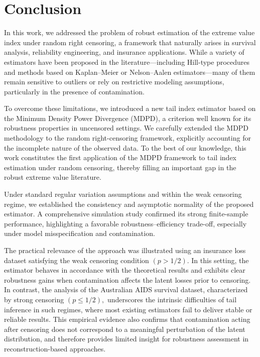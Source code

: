 \documentclass[reqno,openbib,runningheads,a4paper,12pt]{amsart}%
\begin{document}
\section{\textbf{Conclusion}}

\noindent In this work, we addressed the problem of robust estimation of the
extreme value index under random right censoring, a framework that naturally
arises in survival analysis, reliability engineering, and insurance
applications. While a variety of estimators have been proposed in the
literature---including Hill-type procedures and methods based on Kaplan--Meier
or Nelson--Aalen estimators---many of them remain sensitive to outliers or
rely on restrictive modeling assumptions, particularly in the presence of
contamination.\medskip

\noindent To overcome these limitations, we introduced a new tail index
estimator based on the Minimum Density Power Divergence (MDPD), a criterion
well known for its robustness properties in uncensored settings. We carefully
extended the MDPD methodology to the random right-censoring framework,
explicitly accounting for the incomplete nature of the observed data. To the
best of our knowledge, this work constitutes the first application of the MDPD
framework to tail index estimation under random censoring, thereby filling an
important gap in the robust extreme value literature.\medskip

\noindent Under standard regular variation assumptions and within the weak
censoring regime, we established the consistency and asymptotic normality of
the proposed estimator. A comprehensive simulation study confirmed its strong
finite-sample performance, highlighting a favorable robustness--efficiency
trade-off, especially under model misspecification and contamination.\medskip

\noindent The practical relevance of the approach was illustrated using an
insurance loss dataset satisfying the weak censoring condition $(p>1/2).$ In
this setting, the estimator behaves in accordance with the theoretical results
and exhibits clear robustness gains when contamination affects the latent
losses prior to censoring. In contrast, the analysis of the Australian AIDS
survival dataset, characterized by strong censoring $(p\leq1/2),$ underscores
the intrinsic difficulties of tail inference in such regimes, where most
existing estimators fail to deliver stable or reliable results. This empirical
evidence also confirms that contamination acting after censoring does not
correspond to a meaningful perturbation of the latent distribution, and
therefore provides limited insight for robustness assessment in
reconstruction-based approaches.\medskip
\end{document}
